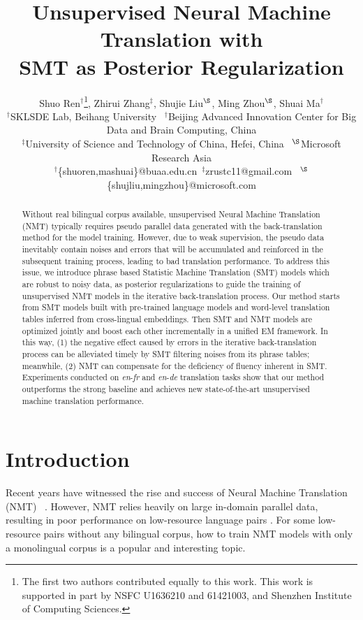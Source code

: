 \documentclass[letterpaper]{article} \usepackage{aaai19}  \usepackage{times}  \usepackage{helvet}  \usepackage{courier}  \usepackage{url}  \usepackage{graphicx}  \usepackage{amsmath}
\begin{document}
\title{Unsupervised Neural Machine Translation with \\
SMT as Posterior Regularization}
\author{Shuo Ren$^\dag$\thanks{The first two authors contributed equally to this work. This work is supported in part by NSFC U1636210 and 61421003, and Shenzhen Institute of Computing Sciences.}, Zhirui Zhang$^\ddag$, Shujie Liu$^\S$, Ming Zhou$^\S$, Shuai Ma$^\dag$ \\
$^\dag$SKLSDE Lab, Beihang University \ $^\dag$Beijing Advanced Innovation Center for Big Data and Brain Computing, China\\
$^\ddag$University of Science and Technology of China, Hefei, China \ 
$^\S$Microsoft Research Asia \\
$^\dag$\{shuoren,mashuai\}@buaa.edu.cn\ $^\ddag$zrustc11@gmail.com \ 
$^{\S}$\{shujliu,mingzhou\}@microsoft.com \\
}
\maketitle
\begin{abstract}
Without real bilingual corpus available, unsupervised Neural Machine Translation (NMT) typically requires pseudo parallel data generated with the back-translation method for the model training. 
However, due to weak supervision, the pseudo data inevitably contain noises and errors that will be accumulated and reinforced in the subsequent training process, leading to bad translation performance. 
To address this issue, we introduce phrase based Statistic Machine Translation (SMT) models which are robust to noisy data, as posterior regularizations to guide the training of unsupervised NMT models in the iterative back-translation process.
Our method starts from SMT models built with pre-trained language models and word-level translation tables inferred from cross-lingual embeddings. Then SMT and NMT models are optimized jointly and boost each other incrementally in a unified EM framework. 
In this way, (1) the negative effect caused by errors in the iterative back-translation process can be alleviated timely by SMT filtering noises from its phrase tables; meanwhile, (2) NMT can compensate for the deficiency of fluency inherent in SMT.
Experiments conducted on \emph{en}-\emph{fr} and \emph{en}-\emph{de} translation tasks show that our method outperforms the strong baseline and achieves new state-of-the-art unsupervised machine translation performance.
\end{abstract}

\section{Introduction}
\label{sec_introduction}
Recent years have witnessed the rise and success of Neural Machine Translation (NMT) ~\cite{sutskever2014sequence,bahdanau2014neural,luong2015effective,wu2016google,vaswani2017attention,hassan2018achieving}. However, NMT relies heavily on large in-domain parallel data, resulting in poor performance on low-resource language pairs \cite{koehn2017six}. 
For some low-resource pairs without any bilingual corpus, how to train NMT models with only a monolingual corpus is a popular and interesting topic.
\end{document}
